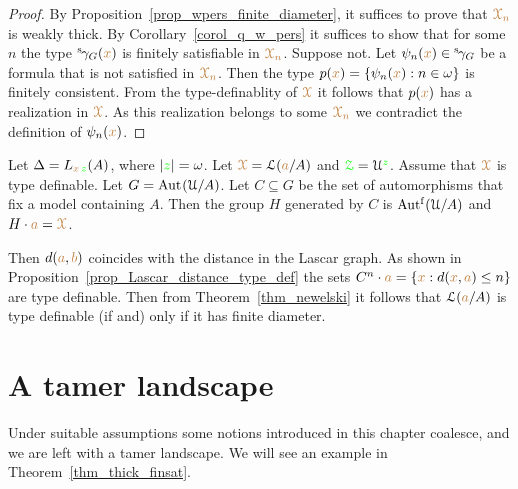 \begin{proof}
  By Proposition~\ref{prop_wpers_finite_diameter}, it suffices to prove that ${\color{brown}\EuScript X_n}$ is weakly thick.
  By Corollary~\ref{corol_q_w_pers} it suffices to show that for some $n$ the type ${}^{\rm s}\kern-.2ex\gamma_G({\color{brown} x})$ is finitely satisfiable in ${\color{brown}\EuScript X_n}$.
  Suppose not.
  Let $\psi_n({\color{brown} x})\in{}^{\rm s}\kern-.2ex\gamma_G$ be a formula that is not satisfied in $\color{brown}\EuScript X_n$.
  Then the type $p({\color{brown} x})=\{\psi_n({\color{brown} x}):n\in\omega\}$ is finitely consistent.
  From the type-definablity of ${\color{brown}\EuScript X}$ it follows that $p({\color{brown} x})$ has a realization in ${\color{brown}\EuScript X}$.
  As this realization belongs to some ${\color{brown}\EuScript X_n}$ we contradict the definition of $\psi_n({\color{brown} x})$.
\end{proof}



\begin{example}\label{ex_newelski}
  Let $\Delta=L_{{\color{brown} x}\,{\color{green} z}}(A)$, where $|{\color{green} z}|=\omega$.
  Let ${\color{brown}\EuScript X}=\EuScript L({\color{brown} a}/A)$ and ${\color{green}\EuScript Z}=\EuScript U^{\color{green} z}$.
  Assume that ${\color{brown}\EuScript X}$ is type definable.
  Let $G={\rm Aut\kern.15ex}(\EuScript U/A)$.
  Let $C\subseteq G$ be the set of automorphisms that fix a model containing $A$.
  Then the group $H$ generated by $C$ is $\mbox{Aut$^{\rm f}$}(\EuScript U/A)$ and $H\cdot{\color{brown}a}={\color{brown}\EuScript X}$.
  
  Then $d({\color{brown} a},{\color{brown} b})$ coincides with the distance in the Lascar graph.
  As shown in Proposition~\ref{prop_Lascar_distance_type_def} the sets $C^n\cdot{\color{brown}a}=\{{\color{brown} x}:d({\color{brown} x},{\color{brown} a})\le n\}$ are type definable.
  Then from Theorem~\ref{thm_newelski} it follows that $\EuScript L({\color{brown} a}/A)$ is type definable (if and) only if it has finite diameter.
\end{example} 

\section{A tamer landscape}\label{tame_landscape}

Under suitable assumptions some notions introduced in this chapter coalesce, and we are left with a tamer landscape.
We will see an example in Theorem~\ref{thm_thick_finsat}.

